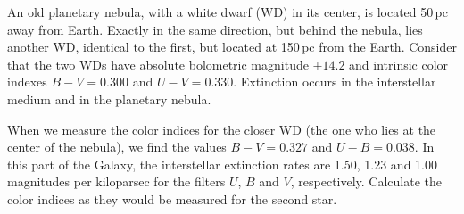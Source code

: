An old planetary nebula, with a white dwarf (WD) in its center, is located
50\,pc away from Earth. Exactly in the same direction, but behind the
nebula, lies another WD, identical to the first, but located at 150\,pc from
the Earth. Consider that the two WDs have absolute bolometric magnitude
$+14.2$ and intrinsic color indexes $B-V = 0.300$ and $U-V = 0.330$.
Extinction occurs in the interstellar medium and in the planetary nebula.

When we measure the color indices for the closer WD (the one who lies at the
center of the nebula), we find the values $B-V = 0.327$ and $U-B = 0.038$.
In this part of the Galaxy, the interstellar extinction rates are 1.50, 1.23
and 1.00 magnitudes per kiloparsec for the filters $U$, $B$ and $V$,
respectively. Calculate the color indices as they would be measured for the
second star.
